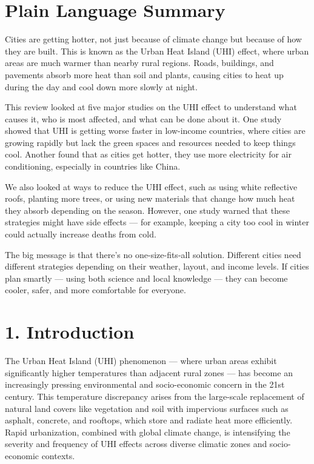 \documentclass[draft]{agujournal}
\begin{document}
\section*{Plain Language Summary}
Cities are getting hotter, not just because of climate change but because of how they are built. This is known as the Urban Heat Island (UHI) effect, where urban areas are much warmer than nearby rural regions. Roads, buildings, and pavements absorb more heat than soil and plants, causing cities to heat up during the day and cool down more slowly at night.

This review looked at five major studies on the UHI effect to understand what causes it, who is most affected, and what can be done about it. One study showed that UHI is getting worse faster in low-income countries, where cities are growing rapidly but lack the green spaces and resources needed to keep things cool. Another found that as cities get hotter, they use more electricity for air conditioning, especially in countries like China.

We also looked at ways to reduce the UHI effect, such as using white reflective roofs, planting more trees, or using new materials that change how much heat they absorb depending on the season. However, one study warned that these strategies might have side effects — for example, keeping a city too cool in winter could actually increase deaths from cold.

The big message is that there’s no one-size-fits-all solution. Different cities need different strategies depending on their weather, layout, and income levels. If cities plan smartly — using both science and local knowledge — they can become cooler, safer, and more comfortable for everyone.

\section*{1. Introduction}

The Urban Heat Island (UHI) phenomenon — where urban areas exhibit significantly higher temperatures than adjacent rural zones — has become an increasingly pressing environmental and socio-economic concern in the 21st century. This temperature discrepancy arises from the large-scale replacement of natural land covers like vegetation and soil with impervious surfaces such as asphalt, concrete, and rooftops, which store and radiate heat more efficiently. Rapid urbanization, combined with global climate change, is intensifying the severity and frequency of UHI effects across diverse climatic zones and socio-economic contexts.
\end{document}
